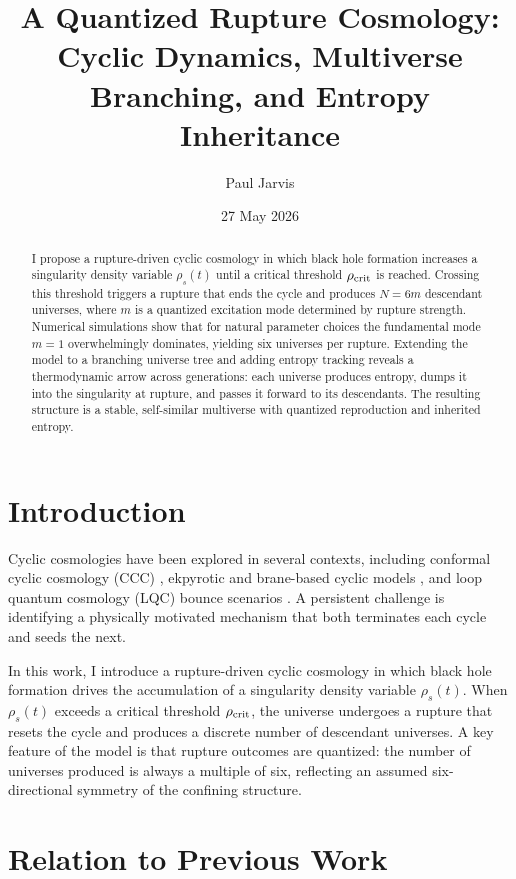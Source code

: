 \documentclass[12pt]{article}
\title{\textbf{A Quantized Rupture Cosmology:\\
Cyclic Dynamics, Multiverse Branching, and Entropy Inheritance}}
\author[1]{Paul Jarvis}
\affil[1]{Independent Researcher, United Kingdom}
\date{27 May 2026}
\begin{document}
\maketitle

\begin{abstract}
I propose a rupture-driven cyclic cosmology in which black hole formation increases a singularity density variable $\rho_s(t)$ until a critical threshold $\rho_{\rm crit}$ is reached. Crossing this threshold triggers a rupture that ends the cycle and produces $N = 6m$ descendant universes, where $m$ is a quantized excitation mode determined by rupture strength. Numerical simulations show that for natural parameter choices the fundamental mode $m=1$ overwhelmingly dominates, yielding six universes per rupture. Extending the model to a branching universe tree and adding entropy tracking reveals a thermodynamic arrow across generations: each universe produces entropy, dumps it into the singularity at rupture, and passes it forward to its descendants. The resulting structure is a stable, self-similar multiverse with quantized reproduction and inherited entropy.
\end{abstract}

\section{Introduction}

Cyclic cosmologies have been explored in several contexts, including conformal cyclic cosmology (CCC) \cite{Penrose2010}, ekpyrotic and brane-based cyclic models \cite{SteinhardtTurok2002,SteinhardtTurok2005}, and loop quantum cosmology (LQC) bounce scenarios \cite{Ashtekar2006}. A persistent challenge is identifying a physically motivated mechanism that both terminates each cycle and seeds the next.

In this work, I introduce a rupture-driven cyclic cosmology in which black hole formation drives the accumulation of a singularity density variable $\rho_s(t)$. When $\rho_s(t)$ exceeds a critical threshold $\rho_{\rm crit}$, the universe undergoes a rupture that resets the cycle and produces a discrete number of descendant universes. A key feature of the model is that rupture outcomes are quantized: the number of universes produced is always a multiple of six, reflecting an assumed six-directional symmetry of the confining structure.

\section{Relation to Previous Work}
\end{document}
